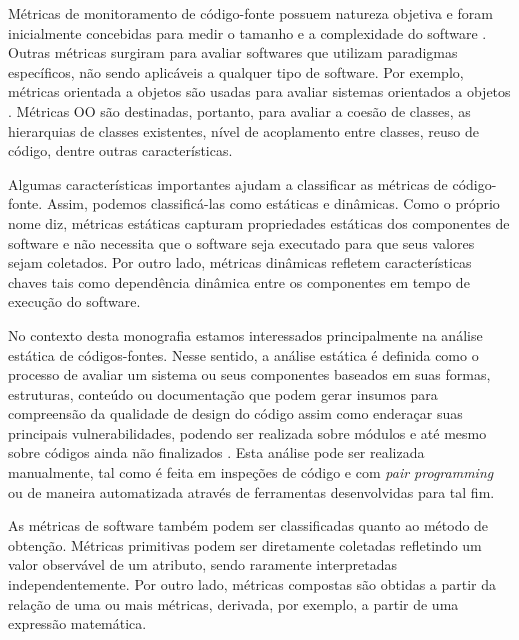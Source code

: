 %

Métricas de monitoramento de código-fonte possuem natureza objetiva e foram inicialmente concebidas para medir o tamanho e a complexidade do software \cite{henry1984kafura}\cite{troy1981zweben}\cite{yau1985zweben}. Outras métricas surgiram para avaliar softwares que utilizam paradigmas específicos, não sendo aplicáveis a qualquer tipo de software. Por exemplo, métricas orientada a objetos são usadas para avaliar sistemas orientados a objetos \cite{systa2000}. Métricas OO são destinadas, portanto, para avaliar a coesão de classes, as hierarquias de classes existentes, nível de acoplamento entre classes, reuso de código, dentre outras características.

%

Algumas características importantes ajudam a classificar as métricas de código-fonte. Assim, podemos classificá-las como estáticas e dinâmicas. Como o próprio nome diz, métricas estáticas capturam propriedades estáticas dos componentes de software e não necessita que o software seja executado para que seus valores sejam coletados. Por outro lado, métricas dinâmicas refletem características chaves tais como dependência dinâmica entre os componentes em tempo de execução do software.

%

No contexto desta monografia estamos interessados principalmente na análise estática de códigos-fontes. Nesse sentido, a análise estática é definida como o processo de avaliar um sistema ou seus componentes baseados em suas formas, estruturas, conteúdo ou documentação que podem gerar insumos para compreensão da qualidade de design do código assim como enderaçar suas principais vulnerabilidades, podendo ser realizada sobre módulos e até mesmo sobre códigos ainda não finalizados \cite{black2009}. Esta análise pode ser realizada manualmente, tal como é feita em inspeções de código e com \emph{pair programming} ou de maneira automatizada através de ferramentas desenvolvidas para tal fim.


%

As métricas de software também podem ser classificadas quanto ao método de obtenção. Métricas primitivas podem ser diretamente coletadas refletindo um valor observável de um atributo, sendo raramente interpretadas independentemente. Por outro lado, métricas compostas são obtidas a partir da relação de uma ou mais métricas, derivada, por exemplo, a partir de uma expressão matemática.

